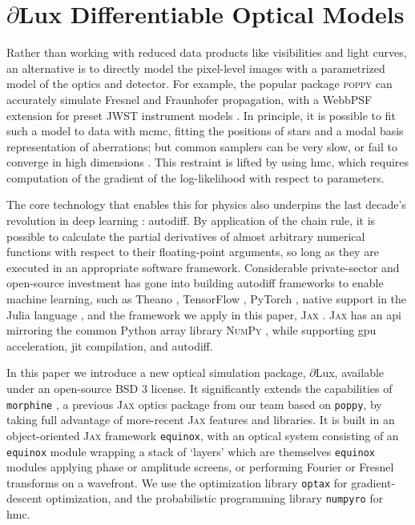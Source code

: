 \documentclass[]{spieman}
\newcommand\jax{\textsc{Jax}\xspace}
\newcommand\dlux{$\partial$Lux\xspace}
\newcommand\equinox{\texttt{equinox}\xspace}
\newcommand\optax{\texttt{optax}\xspace}
\newcommand\numpyro{\texttt{numpyro}\xspace}
\begin{document}
\section{\dlux Differentiable Optical Models}
\label{sec:dlux}

Rather than working with reduced data products like visibilities and light curves, an alternative is to directly model the pixel-level images with a parametrized model of the optics and detector. 
For example, the popular package \textsc{poppy} \cite{poppy} can accurately simulate Fresnel and Fraunhofer propagation, with a WebbPSF extension for preset JWST instrument models \cite{Perrin2014}. 
In principle, it is possible to fit such a model to data with \ac{mcmc}, fitting the positions of stars and a modal basis representation of aberrations; but common samplers can be very slow, or fail to converge in high dimensions \cite{Huijser2022}. This restraint is lifted by using \ac{hmc}, which requires computation of the gradient of the log-likelihood with respect to parameters. 

The core technology that enables this for physics also underpins the last decade's revolution in deep learning \cite{lecun15}: autodiff. By application of the chain rule, it is possible to calculate the partial derivatives of almost arbitrary numerical functions with respect to their floating-point arguments, so long as they are executed in an appropriate software framework. 
Considerable private-sector and open-source investment has gone into building autodiff frameworks to enable machine learning, such as Theano \cite{theano}, TensorFlow \cite{tensorflow2015}, PyTorch \cite{pytorch}, native support in the Julia language \cite{julia}, and the framework we apply in this paper, \textsc{Jax} \cite{jax}. \jax has an \ac{api} mirroring the common Python array library \textsc{NumPy} \cite{numpy}, while supporting \ac{gpu} acceleration, \ac{jit} compilation, and autodiff.

In this paper we introduce a new optical simulation package, \dlux, available under an open-source BSD 3 license. It significantly extends the capabilities of \texttt{morphine} \cite{pope2021,phase_ret_and_design}, a previous \jax optics package from our team based on \texttt{poppy}, by taking full advantage of more-recent \jax features and libraries.  It is built in an object-oriented \jax framework \equinox \cite{kidger2021equinox}, with an optical system consisting of an \equinox module wrapping a stack of `layers' which are themselves \equinox modules applying phase or amplitude screens, or performing Fourier or Fresnel transforms on a wavefront. We use the optimization library \optax \cite{optax2020github} for gradient-descent optimization, and the probabilistic programming library \numpyro \cite{Phan2019} for \ac{hmc}.
\end{document}
